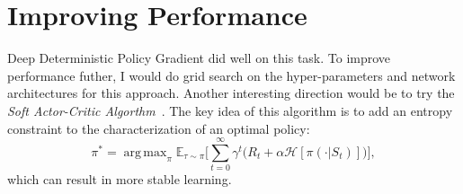 \documentclass[sigchi]{acmart}
\begin{document}
\section{Improving Performance}

Deep Deterministic Policy Gradient did well on this task.  To improve performance futher, I would do grid search on the hyper-parameters and network architectures for this approach.  Another interesting direction would be to try the {\em Soft Actor-Critic Algorthm}~\cite{DBLP:journals/corr/abs-1812-05905}.  The key idea 
of this algorithm is to add an entropy constraint to the characterization of an optimal policy:
	$$\pi^* =  \operatorname{arg\,max}_{\pi}\mathbb{E}_{\tau\sim\pi}\big[\sum_{t=0}^{\infty}\gamma^t\big(R_t+\alpha \mathcal{H} [\pi(\cdot|S_t)]\big)\big],$$
which can result in more stable learning.



\end{document}
